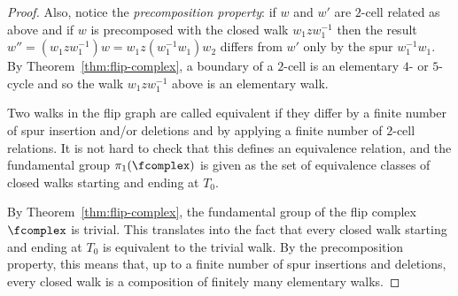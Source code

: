 \begin{proof}
Also, notice the \emph{precomposition property}: if $w$ and $w'$ are $2$-cell related as above and if $w$ is precomposed with the
closed walk $w_1z w_1^{-1}$ then the result $w''=(w_1z w_1^{-1})w=w_1z(w_1^{-1}w_1)w_2$ differs from $w'$ only by the spur $w_1^{-1}w_1$. By Theorem~\ref{thm:flip-complex}, a boundary of a $2$-cell is an elementary $4$- or $5$-cycle and so the walk $w_1z w_1^{-1}$ above is an elementary walk.

Two walks in the flip graph are called equivalent if they differ by a finite number of spur insertion and/or deletions and by applying a finite number of $2$-cell relations. It is not hard to check that this defines an equivalence relation, and the fundamental group $\pi_1(\fcomplex)$ is given as the set of equivalence classes of closed walks starting and ending at $T_0$. 

By Theorem~\ref{thm:flip-complex}, the fundamental group of the flip complex $\fcomplex$ is trivial. This translates into the fact that every closed walk starting and ending at $T_0$ is equivalent to the trivial walk. By 
the precomposition property, this means that, 
up to a finite number of spur insertions and deletions, every closed walk is a composition of finitely many elementary walks.
\end{proof}

